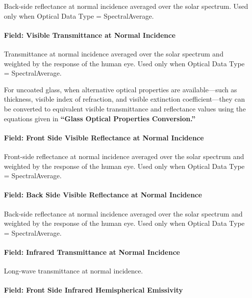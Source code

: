Back-side reflectance at normal incidence averaged over the solar spectrum. Used only when Optical Data Type = SpectralAverage.

\paragraph{Field: Visible Transmittance at Normal Incidence}\label{field-visible-transmittance-at-normal-incidence}

Transmittance at normal incidence averaged over the solar spectrum and weighted by the response of the human eye. Used only when Optical Data Type = SpectralAverage.

For uncoated glass, when alternative optical properties are available---such as thickness, visible index of refraction, and visible extinction coefficient---they can be converted to equivalent visible transmittance and reflectance values using the equations given in \textbf{``Glass Optical Properties Conversion.''}

\paragraph{Field: Front Side Visible Reflectance at Normal Incidence}\label{field-front-side-visible-reflectance-at-normal-incidence}

Front-side reflectance at normal incidence averaged over the solar spectrum and weighted by the response of the human eye. Used only when Optical Data Type = SpectralAverage.

\paragraph{Field: Back Side Visible Reflectance at Normal Incidence}\label{field-back-side-visible-reflectance-at-normal-incidence}

Back-side reflectance at normal incidence averaged over the solar spectrum and weighted by the response of the human eye. Used only when Optical Data Type = SpectralAverage.

\paragraph{Field: Infrared Transmittance at Normal Incidence}\label{field-infrared-transmittance-at-normal-incidence}

Long-wave transmittance at normal incidence.

\paragraph{Field: Front Side Infrared Hemispherical Emissivity}\label{field-front-side-infrared-hemispherical-emissivity}

